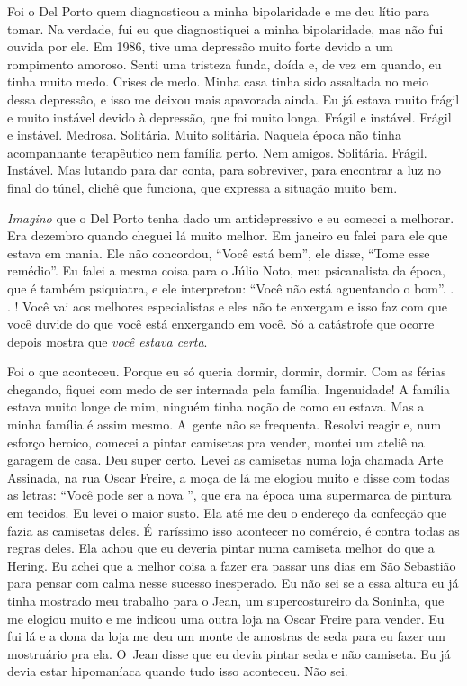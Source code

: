 Foi o Del Porto quem diagnosticou a minha bipolaridade e me deu lítio
para tomar. Na verdade, fui eu que diagnostiquei a minha bipolaridade,
mas não fui ouvida por ele. Em 1986, tive uma depressão muito forte
devido a um rompimento amoroso. Senti uma tristeza funda, doída e, de
vez em quando, eu tinha muito medo. Crises de medo. Minha casa tinha
sido assaltada no meio dessa depressão, e isso me deixou mais apavorada
ainda. Eu já estava muito frágil e muito instável devido à depressão,
que foi muito longa. Frágil e instável. Frágil e instável. Medrosa.
Solitária. Muito solitária. Naquela época não tinha acompanhante
terapêutico nem família perto. Nem amigos. Solitária. Frágil. Instável.
Mas lutando para dar conta, para sobreviver, para encontrar a luz no
final do túnel, clichê que funciona, que expressa a situação muito bem.

\emph{Imagino} que o Del Porto tenha dado um antidepressivo e eu comecei
a melhorar. Era dezembro quando cheguei lá muito melhor. Em janeiro eu
falei para ele que estava em mania. Ele não concordou, ``Você está
bem'', ele disse, ``Tome esse remédio''. Eu falei a mesma coisa para o
Júlio Noto, meu psicanalista da época, que é também psiquiatra, e ele
interpretou: ``Você não está aguentando o bom''. . . ! Você
vai aos melhores especialistas e eles não te enxergam e isso faz com que
você duvide do que você está enxergando em você. Só a catástrofe que
ocorre depois mostra que \emph{você estava certa}.

Foi o que aconteceu. Porque eu só queria dormir, dormir, dormir. Com as
férias chegando, fiquei com medo de ser internada pela família.
Ingenuidade! A família estava muito longe de mim, ninguém tinha noção de
como eu estava. Mas a minha família é assim mesmo. A~gente não se
frequenta. Resolvi reagir e, num esforço heroico, comecei a pintar
camisetas pra vender, montei um ateliê na garagem de casa. Deu super
certo. Levei as camisetas numa loja chamada Arte Assinada, na rua Oscar
Freire, a moça de lá me elogiou muito e disse com todas as letras:
``Você pode ser a nova '', que era na época uma supermarca de
pintura em tecidos. Eu levei o maior susto. Ela até me deu o endereço da
confecção que fazia as camisetas deles. É~raríssimo isso acontecer no
comércio, é contra todas as regras deles. Ela achou que eu deveria
pintar numa camiseta melhor do que a Hering. Eu achei que a melhor coisa
a fazer era passar uns dias em São Sebastião para pensar com calma nesse
sucesso inesperado. Eu não sei se a essa altura eu já tinha mostrado meu
trabalho para o Jean, um supercostureiro da Soninha, que me elogiou
muito e me indicou uma outra loja na Oscar Freire para vender. Eu fui lá
e a dona da loja me deu um monte de amostras de seda para eu fazer um
mostruário pra ela. O~Jean disse que eu devia pintar seda e não
camiseta. Eu já devia estar hipomaníaca quando tudo isso aconteceu. Não
sei.

